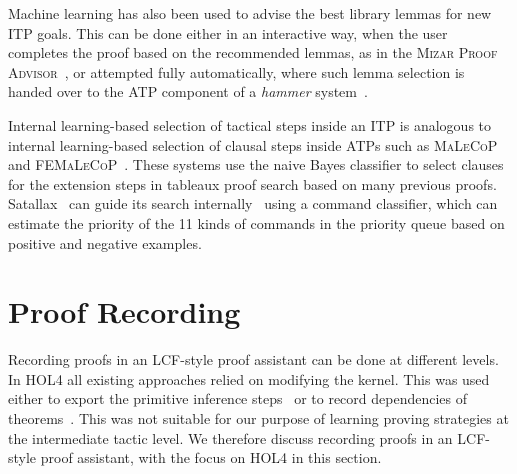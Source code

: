 \documentclass[runningheads,a4paper,draft]{svjour3}
\def\holfour{\textsf{HOL4}\xspace}
\begin{document}


Machine learning has also been used to advise the best library lemmas for new 
ITP goals.
This can be done either in an interactive way, when the user completes the 
proof based on the recommended lemmas, as in the \textsc{Mizar Proof 
Advisor}~\cite{Urb04-MPTP0}, or attempted fully automatically, where such lemma 
selection is handed over to the ATP component of a \emph{hammer} 
system~\cite{hammers4qed,tgck-cpp15,holyhammer,BlanchetteGKKU16,mizAR40}.

Internal learning-based selection of tactical steps inside an ITP is analogous 
to internal learning-based selection of clausal steps inside ATPs such as 
\textsc{MaLeCoP}~\cite{malecop} and \textsc{FEMaLeCoP}~\cite{femalecop}. These 
systems
use the naive Bayes classifier to  select clauses for the extension steps in
tableaux proof search based on many previous proofs. Satallax~\cite{Brown2012a} 
can guide its
search internally~\cite{mllax} using a command classifier, which can estimate 
the priority of the 11 kinds of
commands in the priority queue based on positive and negative examples.




\section{Proof Recording}\label{sec:recording}

Recording proofs in an LCF-style proof assistant can be done at different levels.
In \holfour all existing approaches relied on modifying the kernel. This was used
either to export the primitive inference steps~\cite{Wong95recordingand,DBLP:conf/itp/KumarH12}
or to record dependencies of theorems~\cite{tgck-cpp15}. This was not suitable for our
purpose of learning proving strategies at the intermediate tactic level. We therefore
discuss recording proofs in an LCF-style proof assistant, with the focus on \holfour
in this section.

\end{document}
